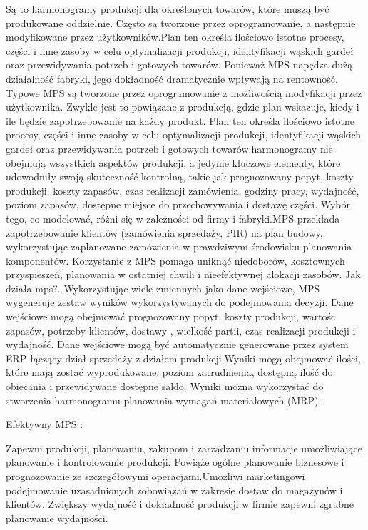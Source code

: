 Są to harmonogramy produkcji dla określonych towarów, które muszą być produkowane oddzielnie. Często są tworzone przez oprogramowanie, a następnie modyfikowane przez użytkowników.Plan ten określa ilościowo istotne procesy, części i inne zasoby w celu optymalizacji produkcji, identyfikacji wąskich gardeł oraz przewidywania potrzeb i gotowych towarów. Ponieważ MPS napędza dużą działalność fabryki, jego dokładność  dramatycznie wpływają na rentowność. Typowe MPS są tworzone przez oprogramowanie z możliwością modyfikacji przez użytkownika.
 Zwykle jest to powiązane z produkcją, gdzie plan wskazuje, kiedy i ile będzie zapotrzebowanie na każdy produkt. Plan ten określa ilościowo istotne procesy, części i inne zasoby w celu optymalizacji produkcji, identyfikacji wąskich gardeł oraz przewidywania potrzeb i gotowych towarów.harmonogramy nie obejmują wszystkich aspektów produkcji, a jedynie kluczowe elementy, które udowodniły swoją skuteczność kontrolną, takie jak prognozowany popyt, koszty produkcji, koszty zapasów, czas realizacji zamówienia, godziny pracy, wydajność, poziom zapasów, dostępne miejsce do przechowywania i dostawę części. Wybór tego, co modelować, różni się w zależności od firmy i fabryki.MPS przekłada zapotrzebowanie klientów (zamówienia sprzedaży, PIR) na plan budowy, wykorzystując zaplanowane zamówienia w prawdziwym środowisku planowania komponentów. Korzystanie z MPS pomaga uniknąć niedoborów, kosztownych przyspieszeń, planowania w ostatniej chwili i nieefektywnej alokacji zasobów.
 Jak działa mps?. Wykorzystując wiele zmiennych jako dane wejściowe, MPS wygeneruje zestaw wyników wykorzystywanych do podejmowania decyzji. Dane wejściowe mogą obejmować prognozowany popyt, koszty produkcji, wartośc zapasów, potrzeby klientów, dostawy , wielkość partii, czas realizacji produkcji i wydajność. Dane wejściowe mogą być automatycznie generowane przez system ERP łączący dział sprzedaży z działem produkcji.Wyniki mogą obejmować ilości, które mają zostać wyprodukowane, poziom zatrudnienia, dostępną ilość do obiecania i przewidywane dostępne saldo. Wyniki można wykorzystać do stworzenia harmonogramu planowania wymagań materiałowych (MRP).

 Efektywny MPS :
 
Zapewni produkcji, planowaniu, zakupom i zarządzaniu informacje umożliwiające planowanie i kontrolowanie produkcji. Powiąże ogólne planowanie biznesowe i prognozowanie ze szczegółowymi operacjami.Umożliwi marketingowi podejmowanie uzasadnionych zobowiązań w zakresie dostaw do magazynów i klientów. Zwiększy wydajność i dokładność produkcji w firmie zapewni zgrubne planowanie wydajności.

